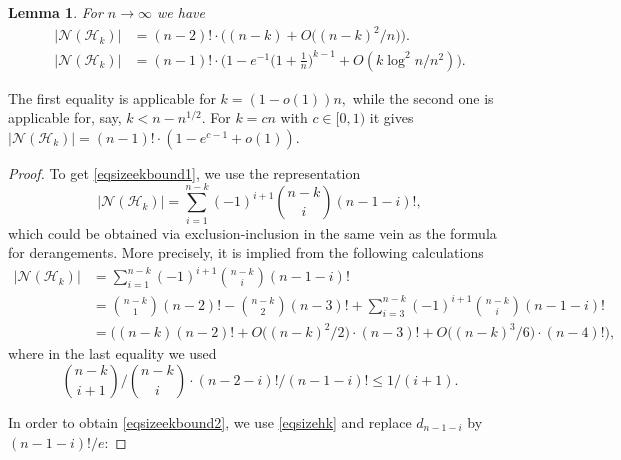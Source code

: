 \documentclass[11pt]{extarticle}
\numberwithin{equation}{section} %
\theoremstyle{plain}
\newtheorem{lem}[thm]{Lemma}
\theoremstyle{definition}
\newcommand{\m}{\mathcal}
\begin{document}
\begin{lem}\label{lemsizehk}
For $n\to \infty$ we have
\begin{align}\label{eqsizeekbound1}|\m N(\m H_k)|&=(n-2)!\cdot \Big((n-k)+O\big((n-k)^2/n\big)\Big).\\
\label{eqsizeekbound2}
|\m N(\m H_k)|&=(n-1)!\cdot\Big(1-e^{-1} \Big(1+\frac 1n\Big)^{k-1}+O(k\log^2 n/n^2)\Big).
\end{align}
\end{lem}
The first equality is applicable for $k=(1-o(1))n,$ while the second one is applicable for, say, $k<n-n^{1/2}$. For $k=cn$ with $c\in [0,1)$ it gives $|\m N(\m H_k)|=(n-1)!\cdot (1-e^{c-1}+o(1))$.
\begin{proof}
    To get \eqref{eqsizeekbound1}, we use the representation 
    \begin{equation}\label{eqinex}|\m N(\m H_k)| = \sum_{i=1}^{n-k}(-1)^{i+1}{n-k\choose i}(n-1-i)!,\end{equation}
    which could be obtained via exclusion-inclusion in the same vein as the formula for derangements. More precisely, it is implied from the following calculations
    \begin{align*}
    |\m{N}(\m H_k)| &= \sum_{i=1}^{n-k}(-1)^{i+1}{n-k\choose i}(n-1-i)! \\&= {n-k\choose 1}(n-2)!-{n-k\choose 2}(n-3)!+\sum_{i=3}^{n-k}(-1)^{i+1}{n-k\choose i}(n-1-i)!\\
    &= \Big( (n-k)(n-2)! + O\Big((n-k)^2/2\Big)\cdot(n-3)! + O\Big((n-k)^3/6\Big)\cdot(n-4)!\Big),
    \end{align*}
    where in the last equality we used 
    $$
    {n-k\choose i+1}/{n-k\choose i}\cdot(n-2-i)!/(n-1-i)! \leq 1/(i+1).
    $$
    
     In order to obtain \eqref{eqsizeekbound2}, we use \eqref{eqsizehk} and replace $d_{n-1-i}$ by $(n-1-i)!/e$:


\end{proof}
\end{document}
